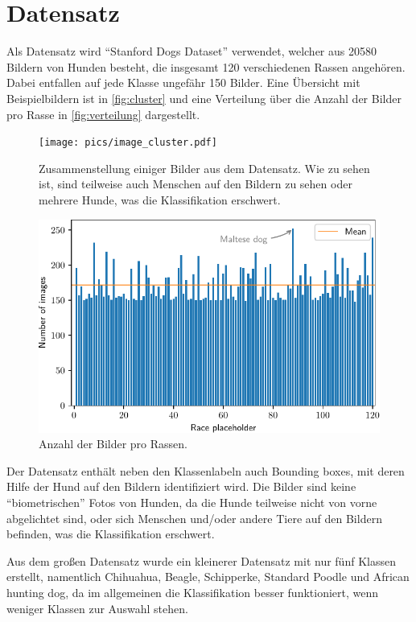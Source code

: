 \section{Datensatz}
\label{chap:datensatz}
Als Datensatz wird \enquote{Stanford Dogs Dataset}\cite{datensatz} verwendet,
welcher aus 20580 Bildern von Hunden besteht, die insgesamt 120 verschiedenen
Rassen angehören. Dabei entfallen auf jede Klasse ungefähr 150 Bilder. Eine
Übersicht mit Beispielbildern ist in \autoref{fig:cluster} und eine Verteilung
über die Anzahl der Bilder pro Rasse in \autoref{fig:verteilung} dargestellt.

\begin{figure}
  \centering
  \texttt{[image: pics/image\_cluster.pdf]}
  \caption{Zusammenstellung einiger Bilder aus dem Datensatz. Wie zu sehen ist,
  sind teilweise auch Menschen auf den Bildern zu sehen oder mehrere Hunde,
  was die Klassifikation erschwert.}
  \label{fig:cluster}
\end{figure}

\begin{figure}
  \centering
  \includegraphics[scale=0.8]{pics/image_distribution.pdf}
  \caption{Anzahl der Bilder pro Rassen.}
  \label{fig:verteilung}
\end{figure}

Der Datensatz enthält neben den Klassenlabeln auch Bounding boxes, mit deren
Hilfe der Hund auf den Bildern identifiziert wird. Die Bilder sind keine
\enquote{biometrischen} Fotos von Hunden, da die Hunde teilweise nicht von vorne
abgelichtet sind, oder sich Menschen und/oder andere Tiere auf den Bildern
befinden, was die Klassifikation erschwert.

Aus dem großen Datensatz wurde ein kleinerer Datensatz mit nur fünf Klassen
erstellt, namentlich Chihuahua, Beagle, Schipperke, Standard Poodle und African
hunting dog, da im allgemeinen die Klassifikation besser funktioniert, wenn
weniger Klassen zur Auswahl stehen.
